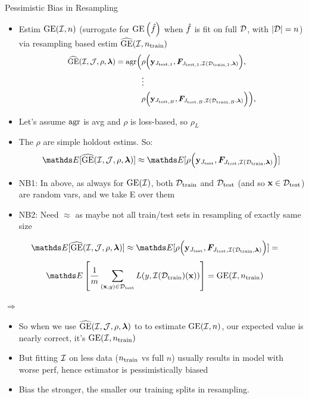 \begin{vbframe}{Pessimistic Bias in Resampling}
\begin{itemize}
    \item Estim $\GE(\ind, n)$ (surrogate for $\GEf$ when $\fh$ is fit on full $\D$, with $|\D|=n$) via resampling based estim
        $\GEh(\ind, \ntrain)$
\begin{equation*}
\small
\begin{split}
\GEhresa = \agr\Big(
 &\rho\Big(\yv_{\Jtesti[1]}, \FJtestftraini[1]\Big), \\ &\large{\vdots} \\
& \rho\Big(\yv_{\Jtesti[B]}, \FJtestftraini[B]\Big)
    \Big),
\end{split}
\end{equation*}
\item Let's assume $\agr$ is avg and $\rho$ is loss-based, so $\rho_L$ 
\item The $\rho$ are simple holdout estims. So:
$$\E[\GEhresa] \approx \E[\rho\Big(\yv_{\Jtest}, \FJtestftrain\Big)] $$
\end{itemize}

\begin{itemize}
    \footnotesize
\item NB1: In above, as always for $\GE(\ind)$, both $\Dtrain$ and $\Dtest$ (and so $\xv \in \Dtest$) are random vars, and we take E over them 
\item NB2: Need $\approx$ as maybe not all train/test sets in resampling of exactly same size
\end{itemize}

\framebreak


\framebreak

$$\E[\GEhresa] \approx \E[\rho\Big(\yv_{\Jtest}, \FJtestftrain\Big)] = $$
$$  \E \left[ \frac{1}{m} \sum_{\xy \in \Dtest} L(y, \ind(\Dtrain)(\xv)) \right] = \GE(\ind, \ntrain)$$



$\Rightarrow$

\begin{itemize}
    \item So when we use $\GEhresa$ to to estimate $\GE(\ind, n)$, our expected value is nearly correct, it's $\GE(\ind, \ntrain)$
    \item But fitting $\ind$ on less data ($\ntrain$ vs full $n$) usually results in model with worse perf, hence estimator is pessimistically biased 
    \item Bias the stronger, the smaller our training splits in resampling.
\end{itemize}
\end{vbframe}

